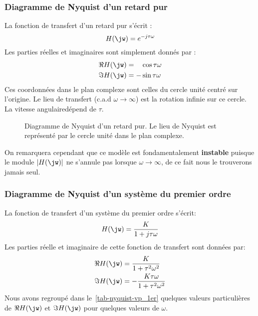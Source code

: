 \subsubsection{Diagramme de Nyquist d'un retard pur}
La fonction de transfert d'un retard pur s'écrit :
$$
H(\jw)=e^{-j\tau\omega}
$$
Les parties réelles et imaginaires sont simplement donnés par :
\begin{align*}
    \Re{H(\jw)}&=\hphantom{-}\cos{\tau\omega}\\
    \Im{H(\jw)}&=-\sin{\tau\omega}
\end{align*}
Ces coordonnées dans le plan complexe sont celles du cercle unité 
centré sur l'origine. Le lieu de transfert (c.a.d $\omega\to\infty$) 
est la rotation infinie sur ce cercle. La \og vitesse angulaire\fg dépend 
de $\tau$.
\begin{figure}[!h]
    \centering
    
    \caption{Diagramme de Nyquist d'un retard pur. Le lieu de Nyquist 
             est représenté par le cercle unité dans le plan complexe.
             \label{fig-nyquist_4}}
\end{figure}
On remarquera cependant que ce modèle est fondamentalement 
\textbf{instable} puisque le module $|H(\jw)|$ ne s'annule pas 
lorsque $\omega\to\infty$, de ce fait nous le trouverons jamais seul.
\newpage
\subsubsection{Diagramme de Nyquist d'un système du premier ordre}
La fonction de transfert d'un système du premier ordre s'écrit:
$$
H(\jw)=\dfrac{K}{1+j\tau\omega}
$$
Les parties réelle et imaginaire de cette fonction de transfert sont données 
par:
\begin{align*}
    \Re{H(\jw)}&=\dfrac{K}{1+\tau^2\omega^2}\\
    \Im{H(\jw)}&=-\dfrac{K\tau\omega}{1+\tau^2\omega^2}\\
\end{align*}
Nous avons regroupé dans le~\cref{tab-nyquist-vp_1er} quelques valeurs 
particulières de $\Re{H(\jw)}$ et $\Im{H(\jw)}$ pour quelques valeurs 
de $\omega$.

